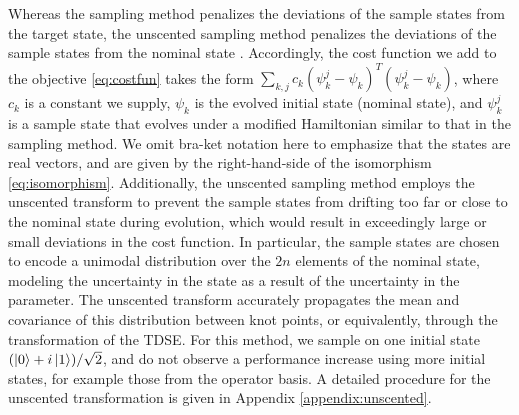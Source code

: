 Whereas the sampling method penalizes the deviations of the sample states
from the target state, the unscented sampling method
penalizes the deviations of the sample states from the nominal state
\cite{howell2020direct, lee2013sigma,
  thangavel2020robust}. Accordingly, the cost function we add
to the objective \eqref{eq:costfun} takes the form
$\sum_{k, j} c_{k} (\psi^{j}_{k} - \psi_{k})^{T}
(\psi^{j}_{k} - \psi_{k})$, where $c_{k}$ is a
constant we supply, $\psi_{k}$ is
the evolved initial state (nominal state), and $\psi^{j}_{k}$ is a sample state
that evolves under a modified Hamiltonian similar to that in the sampling method.
We omit bra-ket notation here to emphasize that
the states are real vectors, and are given by the right-hand-side of the
isomorphism \eqref{eq:isomorphism}. Additionally,
the unscented sampling method employs the unscented transform
\cite{julier2004unscented, uhlmann1995dynamic}
to prevent the sample states
from drifting too far or close to the nominal state during evolution,
which would result in exceedingly large or small deviations in the cost function.
In particular, the sample states are chosen to encode a unimodal distribution over
the $2n$ elements of the nominal state, modeling the uncertainty in the state
as a result of the uncertainty in the parameter. The unscented transform
accurately propagates the mean and covariance of this distribution between
knot points, or equivalently, through the transformation of the TDSE.
For this method, we sample on one initial state $(\ket{0} + i\ket{1}) / \sqrt{2}$,
and do not observe a performance increase
using more initial states, for example those from the operator basis.
A detailed procedure for the unscented transformation is given
in Appendix \ref{appendix:unscented}.

